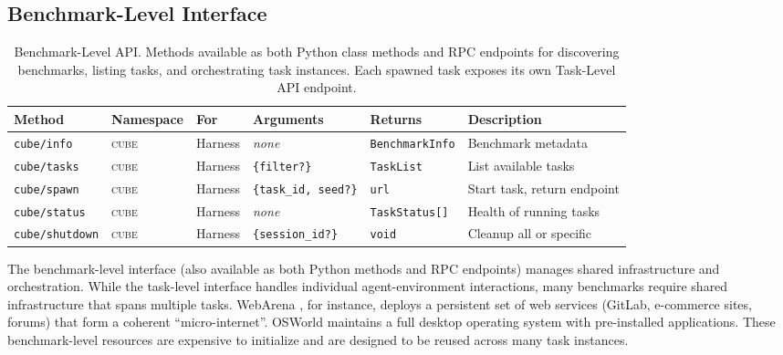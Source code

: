 \documentclass{article}
\theoremstyle{plain}
\theoremstyle{definition}
\theoremstyle{remark}
\begin{document}
\subsection{Benchmark-Level Interface}
\label{sec:benchmark_level}

\begin{table}[t]
\centering
\caption{Benchmark-Level API. Methods available as both Python class methods and RPC endpoints for discovering benchmarks, listing tasks, and orchestrating task instances. Each spawned task exposes its own Task-Level API endpoint.}
\footnotesize
\begin{tabular}{L{2.2cm} C{0.8cm} C{1.1cm} L{2.4cm} L{4cm} L{3cm}}
\toprule
\textbf{Method} & \!\!\!\!\!\textbf{Namespace} & \textbf{For} & \textbf{Arguments} & \textbf{Returns} & \textbf{Description} \\
\midrule
{}
{\scriptsize\texttt{cube/info}} & \textcolor{cubepurple}{\textsc{cube}} & Harness & \textit{none} & \texttt{BenchmarkInfo} & Benchmark metadata \\
{\scriptsize\texttt{cube/tasks}} & \textcolor{cubepurple}{\textsc{cube}} & Harness & \texttt{\{filter?\}} & \texttt{TaskList} & List available tasks \\
{\scriptsize\texttt{cube/spawn}} & \textcolor{cubepurple}{\textsc{cube}} & Harness & \texttt{\{task\_id, seed?\}} & \texttt{url} & Start task, return endpoint \\
{\scriptsize\texttt{cube/status}} & \textcolor{cubepurple}{\textsc{cube}} & Harness & \textit{none} & \texttt{TaskStatus[]} & Health of running tasks \\
{\scriptsize\texttt{cube/shutdown}} & \textcolor{cubepurple}{\textsc{cube}} & Harness & \texttt{\{session\_id?\}} & \texttt{void} & Cleanup all or specific \\
\bottomrule
\end{tabular}
\label{tab:benchmark-api}
\end{table}

The benchmark-level interface (also available as both Python methods and RPC endpoints) manages shared infrastructure and orchestration. 
While the task-level interface handles individual agent-environment interactions, many benchmarks require shared infrastructure that spans multiple tasks. WebArena \citep{ zhou2024webarena}, for instance, deploys a persistent set of web services (GitLab, e-commerce sites, forums) that form a coherent ``micro-internet''. OSWorld \citep{xie2024osworld} maintains a full desktop operating system with pre-installed applications. These benchmark-level resources are expensive to initialize and are designed to be reused across many task instances.
\end{document}
